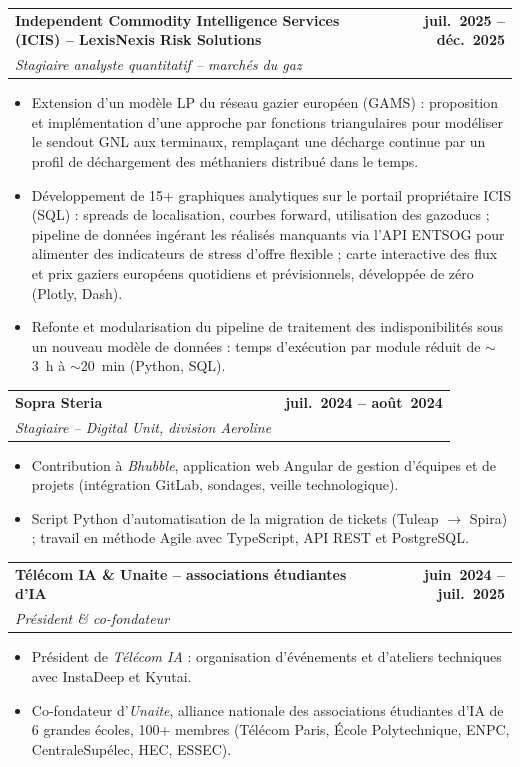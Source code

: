 \documentclass[a4paper,10pt]{article}
\makeatletter
\newcommand{\cventry}[4]{%
  \noindent
  \begin{tabularx}{\textwidth}{@{}X@{\hspace{6pt}}r@{}}
    \textbf{#1} & \textbf{#3}\\
    \textit{#2} & \\
  \end{tabularx}
  \par\vspace{-1pt}
  #4
  \vspace{5pt}
}
\makeatother
\begin{document}
\cventry{Independent Commodity Intelligence Services (ICIS) -- LexisNexis Risk Solutions}%
  {Stagiaire analyste quantitatif -- march\'es du gaz}{juil.~2025 -- d\'ec.~2025}{%
  \begin{itemize}
    \item Extension d'un mod\`ele LP du r\'eseau gazier europ\'een (GAMS) : proposition et impl\'ementation d'une approche par fonctions triangulaires pour mod\'eliser le sendout GNL aux terminaux, rempla\c{c}ant une d\'echarge continue par un profil de d\'echargement des m\'ethaniers distribu\'e dans le temps.
    \item D\'eveloppement de 15+ graphiques analytiques sur le portail propri\'etaire ICIS (SQL) : spreads de localisation, courbes forward, utilisation des gazoducs ; pipeline de donn\'ees ing\'erant les r\'ealis\'es manquants via l'API ENTSOG pour alimenter des indicateurs de stress d'offre flexible ; carte interactive des flux et prix gaziers europ\'eens quotidiens et pr\'evisionnels, d\'evelopp\'ee de z\'ero (Plotly, Dash).
    \item Refonte et modularisation du pipeline de traitement des indisponibilit\'es sous un nouveau mod\`ele de donn\'ees : temps d'ex\'ecution par module r\'eduit de $\sim$3~h \`a $\sim$20~min (Python, SQL).
  \end{itemize}
}

\cventry{Sopra Steria}%
  {Stagiaire -- Digital Unit, division Aeroline}{juil.~2024 -- ao\^ut~2024}{%
  \begin{itemize}
    \item Contribution \`a \textit{Bhubble}, application web Angular de gestion d'\'equipes et de projets (int\'egration GitLab, sondages, veille technologique).
    \item Script Python d'automatisation de la migration de tickets (Tuleap $\to$ Spira) ; travail en m\'ethode Agile avec TypeScript, API REST et PostgreSQL.
  \end{itemize}
}

\cventry{T\'el\'ecom IA \& Unaite -- associations \'etudiantes d'IA}%
  {Pr\'esident \& co-fondateur}{juin~2024 -- juil.~2025}{%
  \begin{itemize}
    \item Pr\'esident de \textit{T\'el\'ecom IA} : organisation d'\'ev\'enements et d'ateliers techniques avec InstaDeep et Kyutai.
    \item Co-fondateur d'\textit{Unaite}, alliance nationale des associations \'etudiantes d'IA de 6 grandes \'ecoles, 100+ membres (T\'el\'ecom Paris, \'Ecole Polytechnique, ENPC, CentraleSup\'elec, HEC, ESSEC).
  \end{itemize}
}
\end{document}
